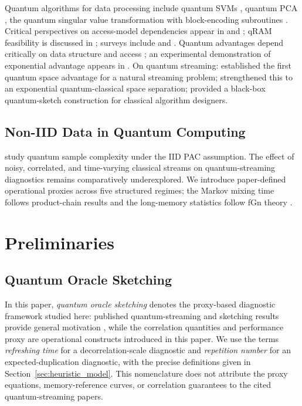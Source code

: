 \documentclass[sensors,article,submit,pdftex,moreauthors]{Definitions/mdpi}
\begin{document}
Quantum algorithms for data processing include quantum SVMs \citep{rebentrost2014quantum}, quantum PCA \citep{lloyd2014quantum}, the quantum singular value transformation \citep{gilyen2019qsvt} with block-encoding subroutines \citep{chakraborty2019blockencodings}. Critical perspectives on access-model dependencies appear in \citet{aaronson2015readthefineprint} and \citet{tang2019quantum}; qRAM feasibility is discussed in \citet{giovannetti2008quantum}; surveys include \citet{chen2024qmlsurvey} and \citet{schuld2018supervised}. Quantum advantages depend critically on data structure and access \citep{huang2021powerofdata}; an experimental demonstration of exponential advantage appears in \citet{huang2022experiments}. On quantum streaming: \citet{kallaugher2021streaming} established the first quantum space advantage for a natural streaming problem; \citet{kallaugher2024maxdicut} strengthened this to an exponential quantum-classical space separation; \citet{kallaugher2025designquantum} provided a black-box quantum-sketch construction for classical algorithm designers.

\subsection{Non-IID Data in Quantum Computing}

\citet{arunachalam2018optimal} study quantum sample complexity under the IID PAC assumption. The effect of noisy, correlated, and time-varying classical streams on quantum-streaming diagnostics remains comparatively underexplored. We introduce paper-defined operational proxies across five structured regimes; the Markov mixing time follows product-chain results \citep{levin2017mixing} and the long-memory statistics follow fGn theory \citep{mandelbrot1968fbm, beran1994statistics}.


\section{Preliminaries}
\label{sec:prelim}

\subsection{Quantum Oracle Sketching}

In this paper, \emph{quantum oracle sketching} denotes the proxy-based diagnostic framework studied here: published quantum-streaming and sketching results provide general motivation \citep{kallaugher2021streaming, kallaugher2024maxdicut, kallaugher2025designquantum}, while the correlation quantities and performance proxy are operational constructs introduced in this paper. We use the terms \emph{refreshing time} for a decorrelation-scale diagnostic and \emph{repetition number} for an expected-duplication diagnostic, with the precise definitions given in Section~\ref{sec:heuristic_model}. This nomenclature does not attribute the proxy equations, memory-reference curves, or correlation guarantees to the cited quantum-streaming papers.
\end{document}
